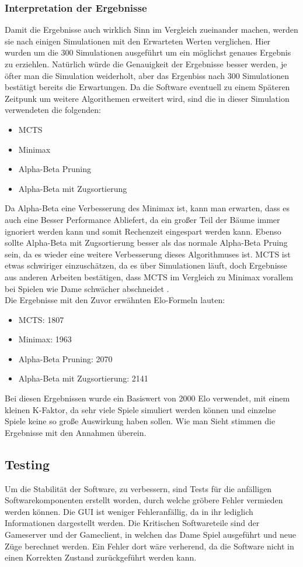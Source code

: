 \documentclass[12pt,a4paper,bibliography=totocnumbered,listof=totocnumbered]{article}
\begin{document}
\subsubsection{Interpretation der Ergebnisse}
Damit die Ergebnisse auch wirklich Sinn im Vergleich zueinander machen, werden sie nach einigen Simulationen mit den Erwarteten Werten verglichen.
Hier wurden um die 300 Simulationen ausgeführt um ein möglichst genaues Ergebnis zu erziehlen. Natürlich würde die Genauigkeit der Ergebnisse 
besser werden, je öfter man die Simulation weiderholt, aber das Ergenbiss nach 300 Simulationen bestätigt bereits die Erwartungen.
Da die Software eventuell zu einem Späteren Zeitpunk um weitere Algorithemen erweitert wird, sind die in dieser Simulation verwendeten die folgenden:
\begin{itemize}
    \item MCTS
    \item Minimax 
    \item Alpha-Beta Pruning
    \item Alpha-Beta mit Zugsortierung 
\end{itemize}
Da Alpha-Beta eine Verbesserung des Minimax ist, kann man erwarten, dass es auch eine Besser Performance Abliefert, da ein großer Teil der Bäume 
immer ignoriert werden kann und somit Rechenzeit eingespart werden kann. Ebenso sollte Alpha-Beta mit Zugsortierung besser als das normale 
Alpha-Beta Pruing sein, da es wieder eine weitere Verbesserung dieses Algorithmuses ist. MCTS ist etwas schwiriger einzuschätzen, da 
es über Simulationen läuft, doch Ergebnisse aus anderen Arbeiten bestätigen, dass MCTS im Vergleich zu Minimax vorallem bei Spielen wie Dame 
schwächer abschneidet \cite{MiniaxMCTScomparison}.
\\
Die Ergebnisse mit den Zuvor erwähnten Elo-Formeln lauten:
\begin{itemize}
    \item MCTS: 1807
    \item Minimax: 1963
    \item Alpha-Beta Pruning: 2070
    \item Alpha-Beta mit Zugsortierung: 2141
\end{itemize}
Bei diesen Ergebnissen wurde ein Basiswert von 2000 Elo verwendet, mit einem kleinen K-Faktor, da sehr viele Spiele simuliert werden können und 
einzelne Spiele keine so große Auswirkung haben sollen. Wie man Sieht stimmen die Ergebnisse mit den Annahmen überein.

\subsection{Testing}
Um die Stabilität der Software, zu verbessern, sind Tests für die anfälligen Softwarekomponenten erstellt worden, durch welche gröbere Fehler vermieden werden können.
Die GUI ist weniger Fehleranfällig, da in ihr lediglich Informationen dargestellt werden. Die Kritischen Softwareteile sind der Gameserver und der Gameclient, 
in welchen das Dame Spiel ausgeführt und neue Züge berechnet werden. Ein Fehler dort wäre verherend, da die Software nicht in einen Korrekten Zustand zurückgeführt
werden kann.
\end{document}
